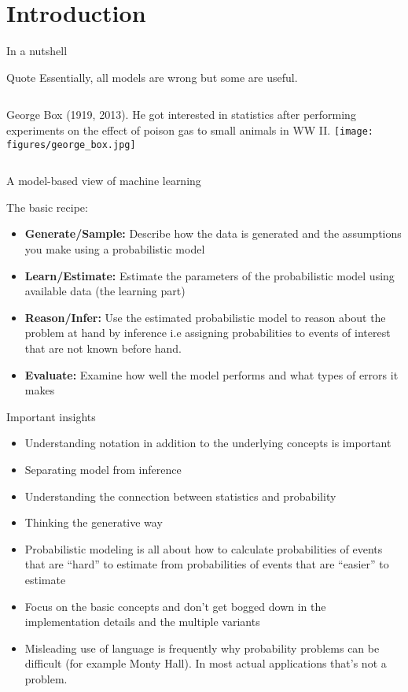 \documentclass[12pt]{beamer}
\begin{document}
\section{Introduction}


\begin{frame}{In a nutshell} 
\begin{block}{Quote} 
Essentially, all models are wrong but some are useful. 
\end{block}

\begin{columns}
 George Box (1919, 2013). He got interested in
statistics after performing experiments on the effect of poison gas to
small animals in WW II.  
\texttt{[image: figures/george\_box.jpg]}
\end{columns}

\end{frame} 


\begin{frame}{A model-based view of machine learning}

The basic recipe:
\begin{itemize} 
\item {\bf Generate/Sample:} Describe how the data is generated and
  the assumptions you make using a probabilistic model
\item {\bf Learn/Estimate:} Estimate the parameters of the
  probabilistic model using available data (the learning part)
\item {\bf Reason/Infer:} Use the estimated probabilistic model to
  reason about the problem at hand by inference i.e assigning probabilities
  to events of interest that are not known before hand. 
\item {\bf Evaluate:} Examine how well the model performs and what
  types of errors it makes
\end{itemize} 
\end{frame}


\begin{frame}{Important insights}

\begin{itemize}
  \item Understanding notation in addition to the underlying concepts is
  important
\item Separating model from inference
\item Understanding the connection between statistics and probability 
\item Thinking the generative way
\item Probabilistic modeling is all about how to calculate
  probabilities of events that are ``hard'' to estimate from
  probabilities of events that are ``easier'' to estimate
\item Focus on the basic concepts and don't get bogged down in the
  implementation details and the multiple variants
\item Misleading use of language is frequently why probability
  problems can be difficult (for example Monty Hall). In most actual
  applications that's not a problem.
\end{itemize}

\end{frame} 
\end{document}
